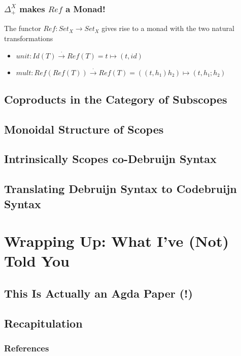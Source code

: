\documentclass[aspectratio=169]{beamer}
\theoremstyle{remarkstyle}
\begin{document}
\begin{frame}[fragile]
  \frametitle{$Δ_+^X$ makes $Ref$ a Monad!}
  \begin{theorem}
    The functor $Ref : Set_X → Set_X$ gives rise to a monad with the two natural transformations
    \begin{itemize}
      \item $unit : Id(T) \stackrel{⋅}{→} Ref(T) = t ↦ (t, id)$ 
      \item $mult : Ref(Ref(T)) \stackrel{⋅}{→} Ref(T) = ((t, h₁) h₂) ↦ (t, h₁;h₂)$
    \end{itemize}
  \end{theorem}
  \begin{example}
  \end{example}
\end{frame}

\subsection{Coproducts in the Category of Subscopes}



\subsection{Monoidal Structure of Scopes}
\subsection{Intrinsically Scopes co-Debruijn Syntax}

\subsection{Translating Debruijn Syntax to Codebruijn Syntax}


\section{Wrapping Up: What I've (Not) Told You}
\subsection{This Is Actually an Agda Paper (!)}
\subsection{Recapitulation}

\begin{frame}[fragile]
  \frametitle{References}
  \nocite{catsandtypes}
  \printbibliography{}
\end{frame}
\end{document}
